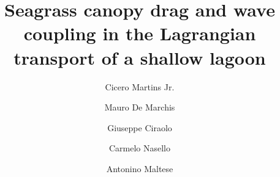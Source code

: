 \documentclass[review,12pt,authoryear]{elsarticle}
\begin{document}
\begin{frontmatter}

\title{Seagrass canopy drag and wave coupling in the Lagrangian transport of a
       shallow lagoon}

\author[unipa]{Cicero Martins Jr.}

\author[unipa]{Mauro De Marchis}
\author[unipa]{Giuseppe Ciraolo}
\author[unipa]{Carmelo Nasello}
\author[unipa]{Antonino Maltese}



\end{frontmatter}
\end{document}
